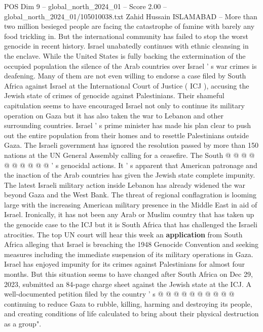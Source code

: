 \begin{textsample}{POS Dim 9 – global\_north\_2024\_01 – Score 2.00 – global\_north\_2024\_01/105010038.txt}  \label{ex:f9_pos_252}
Zahid Hussain ISLAMABAD -- More than two million besieged people are facing the catastrophe of famine with barely any food trickling in.
But the international community has failed to stop the worst genocide in recent history.
Israel unabatedly continues with ethnic cleansing in the enclave.
While the United States is fully backing the extermination of the occupied population the silence of the Arab countries over Israel ' s war crimes is deafening.
Many of them are not even willing to endorse a case filed by South Africa against Israel at the International Court of Justice ( ICJ ), accusing the Jewish state of crimes of genocide against Palestinians.
Their shameful capitulation seems to have encouraged Israel not only to continue its military operation on Gaza but it has also taken the war to Lebanon and other surrounding countries.
Israel ' s prime minister has made his plan clear to push out the entire population from their homes and to resettle Palestinians outside Gaza.
The Israeli government has ignored the resolution passed by more than 150 nations at the UN General Assembly calling for a ceasefire.
The South @ @ @ @ @ @ @ @ @ @ ' s genocidal actions.
It ' s apparent that American patronage and the inaction of the Arab countries has given the Jewish state complete impunity.
The latest Israeli military action inside Lebanon has already widened the war beyond Gaza and the West Bank.
The threat of regional conflagration is looming large with the increasing American military presence in the Middle East in aid of Israel.
Ironically, it has not been any Arab or Muslim country that has taken up the genocide case to the ICJ but it is South Africa that has challenged the Israeli atrocities.
The top UN court will hear this week an \textbf{application} from South Africa alleging that Israel is breaching the 1948 Genocide Convention and seeking measures including the immediate suspension of its military operations in Gaza.
Israel has enjoyed impunity for its crimes against Palestinians for almost four months.
But this situation seems to have changed after South Africa on Dec 29, 2023, submitted an 84-page charge sheet against the Jewish state at the ICJ.
A well-documented petition filed by the country ' s @ @ @ @ @ @ @ @ @ @ continuing to reduce Gaza to rubble, killing, harming and destroying its people, and creating conditions of life calculated to bring about their physical destruction as a group".

\end{textsample}
